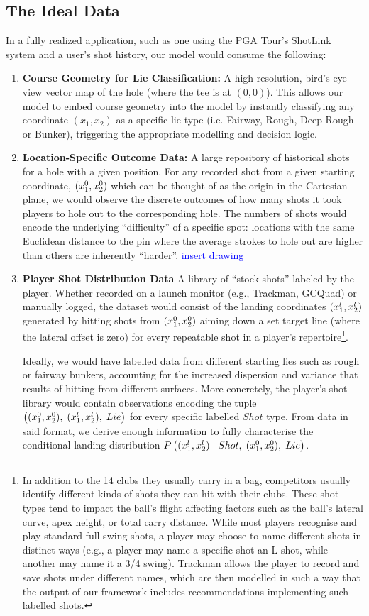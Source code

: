 \documentclass[11pt, letterpaper]{article}
\begin{document}
\subsection{The Ideal Data} 
\label{ref:idealData}
In a fully realized application, such as one using the PGA Tour's ShotLink system and a user's shot history, our model would consume the following:
\begin{enumerate}
    \item \textbf{Course Geometry for Lie Classification:} A high resolution, bird's-eye view vector map of the hole (where the tee is at $(0,0)$). This allows our model to embed course geometry into the model by instantly classifying any coordinate $(x_1,x_2)$ as a specific lie type (i.e. Fairway, Rough, Deep Rough or Bunker), triggering the appropriate modelling and decision logic.
    \item \textbf{Location-Specific Outcome Data:} A large repository of historical shots for a hole with a given position. For any recorded shot from a given starting coordinate, $(x_1^0,x_2^0)$ which can be thought of as the origin in the Cartesian plane, we would observe the discrete outcomes of how many shots it took players to hole out to the corresponding hole. The numbers of shots would encode the underlying ``difficulty'' of a specific spot: locations with the same Euclidean distance to the pin where the average strokes to hole out are higher than others are inherently ``harder''. \textcolor{blue}{insert drawing}
    \item \textbf{Player Shot Distribution Data} A library of ``stock shots'' labeled by the player. Whether recorded on a launch monitor (e.g., Trackman, GCQuad) or manually logged, the dataset would consist of the landing coordinates $(x_1^l,x_2^l)$ generated by hitting shots from  $(x_1^0,x_2^0)$ aiming down a set target line (where the lateral offset is zero) for every repeatable shot in a player's repertoire\footnote{In addition to the 14 clubs they usually carry in a bag, competitors usually identify different kinds of shots they can hit with their clubs. These shot-types tend to impact the ball's flight affecting factors such as the ball's lateral curve, apex height, or total carry distance. While most players recognise and play standard full swing shots, a player may choose to name different shots in distinct ways (e.g., a player may name a specific shot an L-shot, while another may name it a 3/4 swing). Trackman allows the player to record and save shots under different names, which are then modelled in such a way that the output of our framework includes recommendations implementing such labelled shots.}. 
    
    Ideally, we would have labelled data from different starting lies such as rough or fairway bunkers, accounting for the increased dispersion and variance that results of hitting from different surfaces. More concretely, the player's shot library would contain observations encoding the tuple $\left((x_1^0,x_2^0), \;(x_1^l,x_2^l),\; Lie\right)$ for every specific labelled $Shot$ type. From data in said format, we derive enough information to fully characterise the conditional landing distribution $P\left((x_1^l,x_2^l)\;|\;Shot,\; (x_1^0,x_2^0),\; Lie\right)$.
\end{enumerate}
\end{document}
